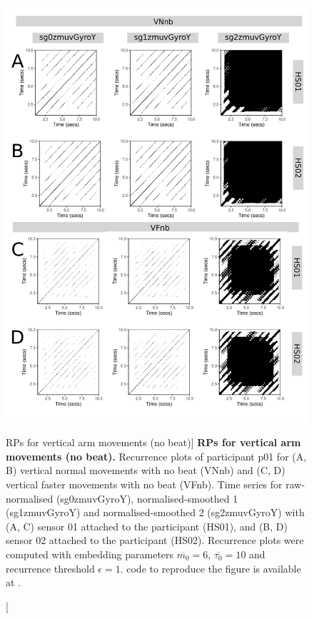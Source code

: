 \begin{figure}
\centering
\includegraphics[height=0.8\textheight]{fig_5_11}
\caption
	[RPs for vertical arm movements (no beat)]{
	{\bf RPs for vertical arm movements (no beat).}	
	Recurrence plots of participant p01 for 
	(A, B) vertical normal movements with no beat (VNnb) and
	(C, D) vertical faster movements with no beat (VFnb).
	Time series for raw-normalised (sg0zmuvGyroY), 
	normalised-smoothed 1 (sg1zmuvGyroY) and 
	normalised-smoothed 2 (sg2zmuvGyroY) with
	(A, C) sensor 01 attached to the participant (HS01), and
	(B, D) sensor 02 attached to the participant (HS02).
	Recurrence plots were computed with 
	embedding parameters $\overline{m_0}=6$, $\overline{\tau_0}=10$ and 
	recurrence threshold $\epsilon=1$.
	\R code to reproduce the figure is available at 
	.
        }
    \label{fig:rps_Vnb_w500}
\end{figure}
